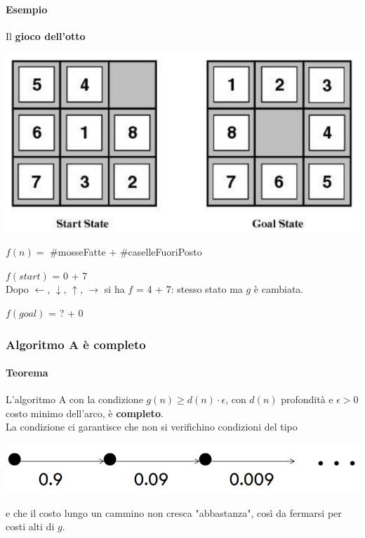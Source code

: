 \documentclass[10pt]{book}
\begin{document}
\paragraph{Esempio} Il \textbf{gioco dell'otto}
\begin{multicols}{2}
\begin{center}
	\includegraphics[scale=0.5]{8game.png}
\end{center}
\begin{list}{}{}
	\item $f(n) = $ \#mosseFatte $+$ \#caselleFuoriPosto
	\item $f(start)$ = 0 + 7\\Dopo $\leftarrow$, $\downarrow$, $\uparrow$, $\rightarrow$ si ha $f$ = 4 + 7: stesso stato ma $g$ è cambiata.
	\item $f(goal)$ = ? + 0
\end{list}
\end{multicols}
\pagebreak
\subsubsection{Algoritmo A è completo}
\paragraph{Teorema} L'algoritmo A con la condizione $g(n) \geq d(n)\cdot\epsilon$, con $d(n)$ profondità e $\epsilon > 0$ costo minimo dell'arco, è \textbf{completo}.\\
La condizione ci garantisce che non si verifichino condizioni del tipo
\begin{center}
	\includegraphics[scale=0.5]{complA.png}
\end{center}
e che il costo lungo un cammino non cresca "abbastanza", così da fermarsi per costi alti di $g$.
\end{document}

